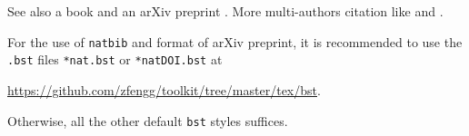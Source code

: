 	See also a book \citet*{Parry1981} and an arXiv preprint \cite{Feng2020}.
	More multi-authors citation like \citet*{BenoistQuint2016} and \citet*{FanEtAl2002}.
	
	\begin{remark}
		For the use of \verb*|natbib| and format of arXiv preprint, it is recommended to use the \verb*|.bst| files \verb*|*nat.bst| or \verb*|*natDOI.bst| at
		
		\href{https://github.com/zfengg/toolkit/tree/master/tex/bst}{https://github.com/zfengg/toolkit/tree/master/tex/bst}.
		
		Otherwise, all the other default \verb*|bst| styles suffices.
	\end{remark}
	
